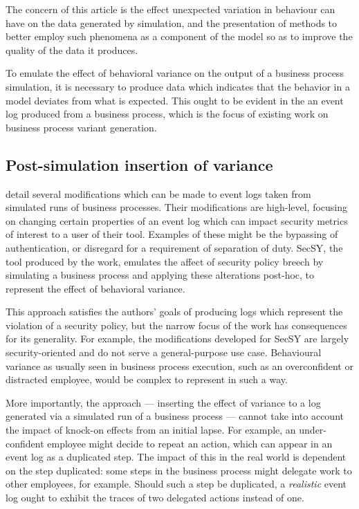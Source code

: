 \documentclass[12pt]{llncs}  %
\begin{document}
The concern of this article is the effect unexpected variation in behaviour can
have on the data generated by simulation, and the presentation of methods to
better employ such phenomena as a component of the model so as to improve the
quality of the data it produces.
\par

To emulate the effect of behavioral variance on the output of a business process
simulation, it is necessary to produce data which indicates that the behavior in
a model deviates from what is expected. This ought to be evident in the an event
log produced from a business process, which is the focus of existing work on
business process variant generation.
\par

\subsection{Post-simulation insertion of variance}
\cite{accorsi2013secsy} detail several modifications which can be made to event
logs taken from simulated runs of business processes. Their modifications are
high-level, focusing on changing certain properties of an event log which can
impact security metrics of interest to a user of their tool. Examples of these 
might be the bypassing of authentication, or disregard for a requirement of
separation of duty. SecSY, the tool produced by the work, emulates the affect of
security policy breech by simulating a business process and applying these
alterations post-hoc, to represent the effect of behavioral variance.
\par

This approach satisfies the authors' goals of producing logs which represent the
violation of a security policy, but the narrow focus of the work has
consequences for its generality. For example, the modifications developed for
SecSY are largely security-oriented and do not serve a general-purpose use case.
Behavioural variance as usually seen in business process execution, such as an
overconfident or distracted employee, would be complex to represent in such a
way.
\par

More importantly, the approach --- inserting the effect of variance to a log
generated via a simulated run of a business process --- cannot take into account
the impact of knock-on effects from an initial lapse. For example, an
under-confident employee might decide to repeat an action, which can appear in
an event log as a duplicated step. The impact of this in the real world is
dependent on the step duplicated: some steps in the business process might
delegate work to other employees, for example. Should such a step be duplicated,
a \emph{realistic} event log ought to exhibit the traces of two delegated
actions instead of one.
\par
\end{document}
